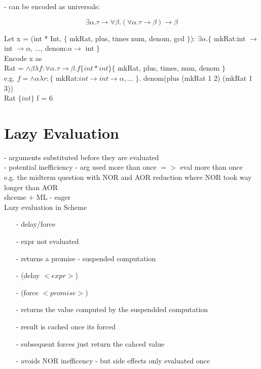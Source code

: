 \documentclass[11pt]{article}
\begin{document}
- can be encoded as universals:

$$\exists \alpha.\tau \rightarrow \forall \beta.(\forall \alpha.\tau \rightarrow \beta) \rightarrow \beta$$

Let x = (int * Int, $\{$ mkRat, plus, times num, denom, gcd $\}$): $\exists \alpha .\{$ mkRat:int $\rightarrow$ int $\rightarrow \alpha$, ..., denom:$\alpha \rightarrow$ int $\}$ \\

Encode x as \\

Rat = $\wedge \beta \lambda f: \forall \alpha. \tau \rightarrow \beta . f\{int*int\} \{$ mkRat, plus, times, num, denom $\}$ \\

e.g. $f = \wedge \alpha \lambda r: \{$ mkRat:$int \rightarrow int \rightarrow \alpha,$... $\}$. denom(plus (mkRat 1 2) (mkRat 1 3)) \\

Rat $\{int\}$ f = 6 \\

\section{Lazy Evaluation}

- arguments substituted before they are evaluated \\

- potential inefficiency - arg used more than once $=>$ eval more than once \\

e.g. the midterm question with NOR and AOR reduction where NOR took way longer than AOR \\

shceme + ML - eager \\

Lazy evaluation in Scheme
\begin{itemize}
	\item[-] delay/force
	\item[-] expr not evaluated
	\item[-] returns a promise - suspended computation
	\item[-] (delay $<expr>$)
	\item[-] (force $<promise>$) 
	\item[-] returns the value computed by the suspendded computation
	\item[-] result is cached once its forced
	\item[-] subsequent forces just return the cahced value
	\item[-] avoids NOR inefficency - but side effects only evaluated once
\end{itemize}
\end{document}
